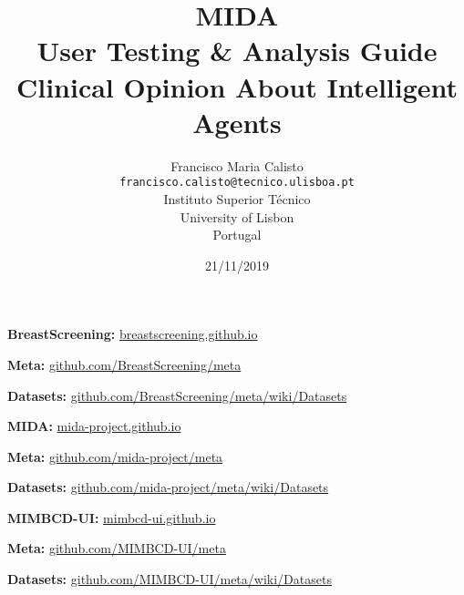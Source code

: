 \documentclass{article}
\title{
MIDA
\\
User Testing \& Analysis Guide
\\
Clinical Opinion About Intelligent Agents
\\
}
\author{
Francisco Maria Calisto\\
\texttt{francisco.calisto@tecnico.ulisboa.pt}\\
Instituto Superior T\'{e}cnico\\
University of Lisbon\\
Portugal
}
\date{21/11/2019}
\begin{document}
\maketitle

\textbf{BreastScreening:} \hfill \href{https://breastscreening.github.io/}{breastscreening.github.io}

\textbf{Meta:} \hfill \href{https://github.com/BreastScreening/meta}{github.com/BreastScreening/meta}

\textbf{Datasets:} \hfill \href{https://github.com/BreastScreening/meta/wiki/Datasets}{github.com/BreastScreening/meta/wiki/Datasets}

\hfill

\textbf{MIDA:} \hfill \href{https://mida-project.github.io/}{mida-project.github.io}

\textbf{Meta:} \hfill \href{https://github.com/mida-project/meta}{github.com/mida-project/meta}

\textbf{Datasets:} \hfill \href{https://github.com/mida-project/meta/wiki/Datasets}{github.com/mida-project/meta/wiki/Datasets}

\hfill

\textbf{MIMBCD-UI:} \hfill \href{https://mimbcd-ui.github.io/}{mimbcd-ui.github.io}

\textbf{Meta:} \hfill \href{https://github.com/MIMBCD-UI/meta}{github.com/MIMBCD-UI/meta}

\textbf{Datasets:} \hfill \href{https://github.com/MIMBCD-UI/meta/wiki/Datasets}{github.com/MIMBCD-UI/meta/wiki/Datasets}

\clearpage














\clearpage

\glsaddall
\printglossary[type=\acronymtype,title=Acronyms]

\clearpage



\end{document}
